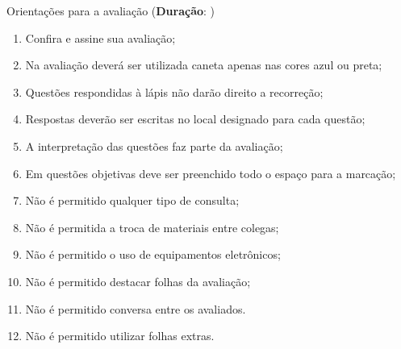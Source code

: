 \FrameSep
\begin{framed}
	\begin{center}
		Orientações para a avaliação (\textbf{Duração}: \underline{\duracao})
	\end{center}
		\begin{multicols}{2}
		{\footnotesize
		\begin{enumerate}
		\itemsep0em
		\item Confira e assine sua avaliação;
		\item Na avaliação deverá ser utilizada caneta apenas nas cores azul ou preta;
		\item Questões respondidas à lápis não darão direito a recorreção;
		\item Respostas deverão ser escritas no local designado para cada questão;
		\item A interpretação das questões faz parte da avaliação;
		\item Em questões objetivas deve ser preenchido todo o espaço para a marcação;
		\item Não é permitido qualquer tipo de consulta;
		\item Não é permitida a troca de materiais entre colegas;
		\item Não é permitido o uso de equipamentos eletrônicos;
		\item Não é permitido destacar folhas da avaliação;
		\item Não é permitido conversa entre os avaliados.		
		\item Não é permitido utilizar folhas extras.
		\end{enumerate}
		}
		\end{multicols}
\end{framed}